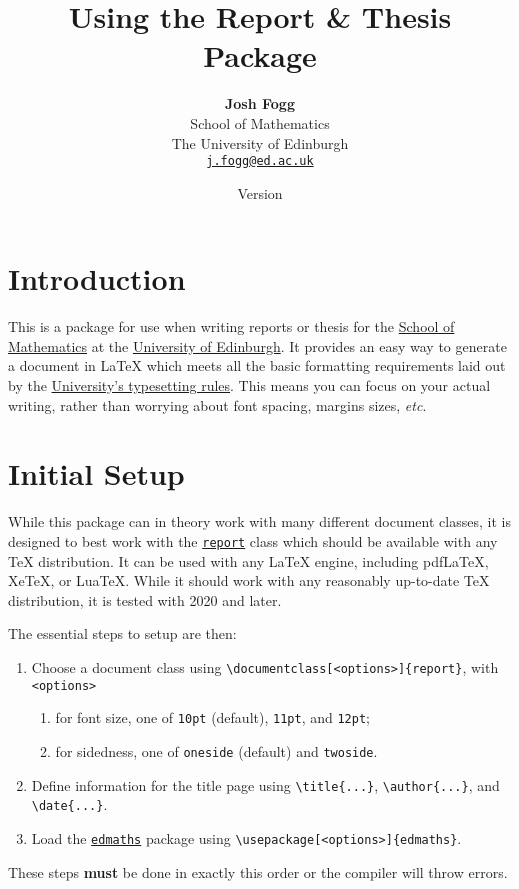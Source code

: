 \documentclass[12pt]{article}
\title{\textbf{Using the \pkg{edmaths} Report \& Thesis Package}}
\author{\textbf{Josh Fogg}\\School of Mathematics\\The University of Edinburgh\\\texttt{\href{mailto:j.fogg@ed.ac.uk}{j.fogg@ed.ac.uk}}}
\date{Version \msuversion\\\msudate}
\newcommand\pkg[1]{\href{https://www.ctan.org/pkg/#1}{\color{teal}\lstinline{#1}}}
\newcommand\key[1]{{\color{orange}\lstinline|#1|}}
\begin{document}
\maketitle
\thispagestyle{empty}

\section{Introduction}

This is a package for use when writing reports or thesis for the \href{https://www.maths.ed.ac.uk/}{School of Mathematics} at the \href{https://www.ed.ac.uk/}{University of Edinburgh}.  It provides an easy way to generate a document in \LaTeX{} which meets all the basic formatting requirements laid out by the \href{https://www.ed.ac.uk/academic-services/students/thesis-submission}{University's typesetting rules}. This means you can focus on your actual writing, rather than worrying about font spacing, margins sizes, {\it etc}.

\section{Initial Setup}

While this package can in theory work with many different document classes, it is designed to best work with the \pkg{report} class which should be available with any \TeX{} distribution. It can be used with any \LaTeX{} engine, including pdfLaTeX, XeTeX, or LuaTeX. While it should work with any reasonably up-to-date TeX distribution, it is tested with 2020 and later.

The essential steps to setup are then:
\begin{enumerate}
	\item Choose a document class using \lstinline|\documentclass[<options>]{report}|, with \key{<options>}
		\begin{enumerate}
			\item for font size, one of \key{10pt} (default), \key{11pt}, and \key{12pt};
			\item for sidedness, one of \key{oneside} (default) and \key{twoside}.
		\end{enumerate}
	\item Define information for the title page using \lstinline|\title{...}|, \lstinline|\author{...}|, and \lstinline|\date{...}|.
	\item Load the \pkg{edmaths} package using \lstinline|\usepackage[<options>]{edmaths}|.
\end{enumerate}
These steps {\bf must} be done in exactly this order or the compiler will throw errors.
\end{document}
